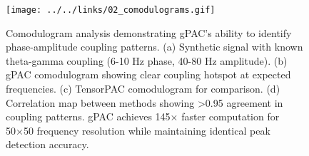 \begin{figure}[htbp]
\centering
\texttt{[image: ../../links/02\_comodulograms.gif]}
\caption{Comodulogram analysis demonstrating gPAC's ability to identify phase-amplitude coupling patterns. 
(a) Synthetic signal with known theta-gamma coupling (6-10 Hz phase, 40-80 Hz amplitude). 
(b) gPAC comodulogram showing clear coupling hotspot at expected frequencies. 
(c) TensorPAC comodulogram for comparison. 
(d) Correlation map between methods showing >0.95 agreement in coupling patterns. 
gPAC achieves 145× faster computation for 50×50 frequency resolution while maintaining identical peak detection accuracy.}
\label{fig:comodulograms}
\end{figure}
